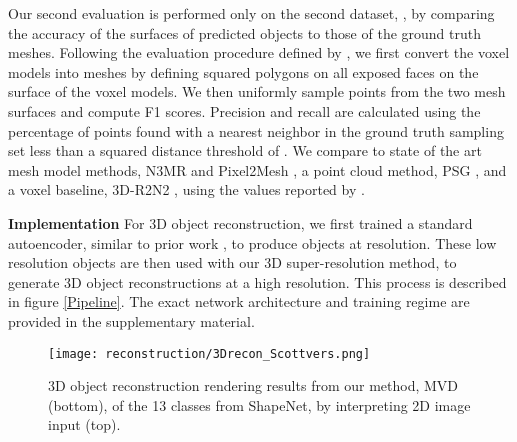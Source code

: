 \documentclass{article}
\begin{document}
Our second evaluation is performed only on the second dataset, , by comparing the accuracy of the surfaces of predicted objects to those of the ground truth meshes. Following the evaluation procedure defined by \citet{pixel2mesh}, we first convert the  voxel models into meshes by defining squared polygons on all exposed faces on the surface of the voxel models. We then uniformly sample points from the two mesh surfaces and compute F1 scores. Precision and recall are calculated using the percentage of points found with a nearest neighbor in the ground truth sampling set less than a squared distance threshold of . We compare to state of the art mesh model methods, N3MR \cite{kato2017neural} and Pixel2Mesh \cite{pixel2mesh}, a point cloud method, PSG \cite{fan2017point}, and a voxel baseline, 3D-R2N2 \cite{choy20163d}, using the values reported by \citet{pixel2mesh}.

\textbf{Implementation} \quad For 3D object reconstruction, we first trained a standard autoencoder, similar to prior work \cite{choy20163d,	3DIWGAN}, to produce objects at  resolution. These low resolution objects are then used with our 3D super-resolution method, to generate 3D object reconstructions at a high  resolution. This process is described in figure \ref{Pipeline}. The exact network architecture and training regime are provided in the supplementary material. 

\begin{figure*}
\texttt{[image: reconstruction/3Drecon\_Scottvers.png]}
\centering
\caption{3D object reconstruction  rendering results from our method, MVD (bottom), of the 13 classes from ShapeNet, by interpreting 2D image input (top).} \label{fig:recons}

\end{figure*}

\begin{table}
  \caption{3D Object Reconstruction IoU at . Cells with a dash - indicate that the corresponding result was not reported by the original author.}  \label{table:reconsIoU} \centering
\end{table}
\end{document}
